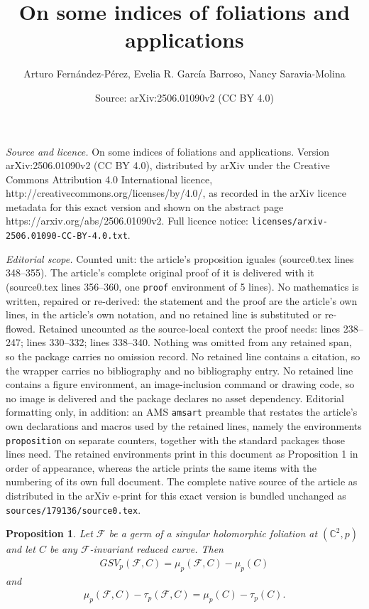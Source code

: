 \documentclass[10pt,a4paper]{amsart}
\title{On some indices of foliations and applications}
\author{Arturo Fern\'andez-P\'erez, Evelia R. Garc\'ia Barroso, Nancy Saravia-Molina}
\date{Source: arXiv:2506.01090v2 (CC BY 4.0)}
\newtheorem{proposition}{Proposition}
\newcommand{\C}{\mathbb{C}}
\newcommand{\F}{\mathcal{F}}
\begin{document}
\maketitle

\noindent\emph{Source and licence.} On some indices of foliations and applications. Version arXiv:2506.01090v2 (CC BY 4.0), distributed by arXiv under the Creative Commons Attribution 4.0 International licence, http://creativecommons.org/licenses/by/4.0/, as recorded in the arXiv licence metadata for this exact version and shown on the abstract page https://arxiv.org/abs/2506.01090v2. Full licence notice: \texttt{licenses/arxiv-2506.01090-CC-BY-4.0.txt}.\par\smallskip

\noindent\textit{Editorial scope.} Counted unit: the article's proposition iguales (source0.tex lines 348--355). The article's complete original proof of it is delivered with it (source0.tex lines 356--360, one \texttt{proof} environment of 5 lines). No mathematics is written, repaired or re-derived: the statement and the proof are the article's own lines, in the article's own notation, and no retained line is substituted or re-flowed.  Retained uncounted as the source-local context the proof needs: lines 238--247; lines 330--332; lines 338--340.  Nothing was omitted from any retained span, so the package carries no omission record.  No retained line contains a citation, so the wrapper carries no bibliography and no bibliography entry.  No retained line contains a figure environment, an image-inclusion command or drawing code, so no image is delivered and the package declares no asset dependency.  Editorial formatting only, in addition: an AMS \texttt{amsart} preamble that restates the article's own declarations and macros used by the retained lines, namely the environments \texttt{proposition} on separate counters, together with the standard packages those lines need.  The retained environments print in this document as Proposition 1 in order of appearance, whereas the article prints the same items with the numbering of its own full document.  The complete native source of the article as distributed in the arXiv e-print for this exact version is bundled unchanged as \texttt{sources/179136/source0.tex}.
\begin{proposition}\label{prop_1}
Let $\F$ be a germ of a singular holomorphic foliation at $(\C^2,p)$ and let $C$ be any $\F$-invariant reduced curve. Then 
\begin{eqnarray}\label{eq_5}
GSV_p(\F,C)=\mu_p(\F,C)-\mu_p(C)
\end{eqnarray}
and 
\begin{eqnarray}\label{eq_impor}
\mu_p(\F,C)-\tau_p(\F,C)=\mu_p(C)-\tau_p(C).
\end{eqnarray}
\end{proposition}
\end{document}
